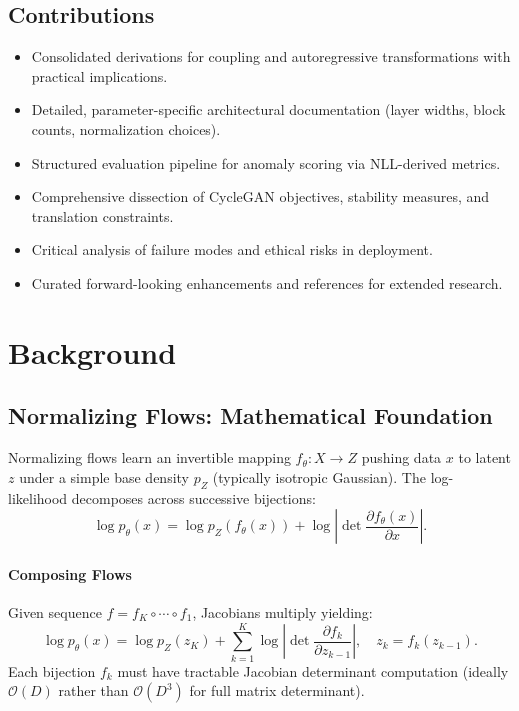 \documentclass[11pt]{article}
\begin{document}
\subsection{Contributions}
\begin{itemize}
 \item Consolidated derivations for coupling and autoregressive transformations with practical implications.
 \item Detailed, parameter-specific architectural documentation (layer widths, block counts, normalization choices).
 \item Structured evaluation pipeline for anomaly scoring via NLL-derived metrics.
 \item Comprehensive dissection of CycleGAN objectives, stability measures, and translation constraints.
 \item Critical analysis of failure modes and ethical risks in deployment.
 \item Curated forward-looking enhancements and references for extended research.
\end{itemize}

\section{Background}
\subsection{Normalizing Flows: Mathematical Foundation}
Normalizing flows learn an invertible mapping $f_{\theta}: X \to Z$ pushing data $x$ to latent $z$ under a simple base density $p_Z$ (typically isotropic Gaussian). The log-likelihood decomposes across successive bijections:
\begin{equation}
\log p_{\theta}(x) = \log p_Z(f_{\theta}(x)) + \log \left| \det \frac{\partial f_{\theta}(x)}{\partial x} \right|.
\end{equation}

\paragraph{Composing Flows} Given sequence $f = f_K \circ \cdots \circ f_1$, Jacobians multiply yielding:
\begin{equation}
\log p_{\theta}(x) = \log p_Z(z_K) + \sum_{k=1}^{K} \log \left| \det \frac{\partial f_k}{\partial z_{k-1}} \right|, \quad z_k = f_k(z_{k-1}).
\end{equation}
Each bijection $f_k$ must have tractable Jacobian determinant computation (ideally $\mathcal{O}(D)$ rather than $\mathcal{O}(D^3)$ for full matrix determinant).
\end{document}
